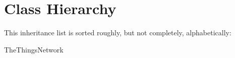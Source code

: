 \section{Class Hierarchy}
This inheritance list is sorted roughly, but not completely, alphabetically\+:\begin{DoxyCompactList}
\item {}
\item {}
\item {}
\item {}
\item The\+Things\+Network\begin{DoxyCompactList}
\item {}
\end{DoxyCompactList}
\end{DoxyCompactList}
